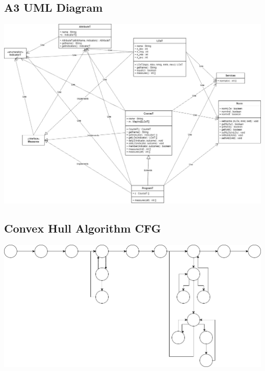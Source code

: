 \documentclass[12pt]{article}
\begin{document}
\subsection*{A3 UML Diagram}
\includegraphics[scale=0.4]{UMLdiagram.png}

\newpage
\subsection*{Convex Hull Algorithm CFG}
\includegraphics[scale=0.5]{CFG.png}
\end{document}

